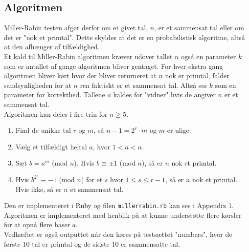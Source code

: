 \documentclass[12pt]{article}
\begin{document}
\subsection*{Algoritmen}
Miller-Rabin testen afgør derfor om et givet tal, $n$, er et sammensat tal eller om det er "nok et primtal". Dette skyldes at det er en probabilistisk algoritme, altså at den afhænger af tilfældighed. \\
Et kald til Miller-Rabin algoritmen kræver udover tallet $n$ også en parameter $k$ som er antallet af gange algoritmen bliver gentaget. For hver ekstra gang algoritmen bliver kørt hvor der bliver returneret at $n$ nok er primtal, falder sandsynligheden for at $n$ ren faktiskt er et sammensat tal. Altså ses $k$ som en parameter for korrekthed. Tallene $a$ kaldes for "vidner" hvis de angiver $n$ er et sammensat tal. \\
Algoritmen kan deles i fire trin for $n\geq 5$.
\begin{enumerate}
\item Find de unikke tal $r$ og $m$, så $n-1=2^r\cdot m$ og $m$ er ulige.
\item Vælg et tilfældigt heltal $a$, hvor $1<a<n$.
\item Sæt $b=a^m$ (mod $n$). Hvis $b\equiv \pm 1$ (mod $n$), så er $n$ nok et primtal.
\item Hvis $b^{2^s}\equiv -1$ (mod $n$) for et $s$ hvor $1\leq s\leq r-1$, så er $n$ nok et primtal. Hvis ikke, så er $n$ et sammensat tal.
\end{enumerate}
Den er implementeret i Ruby og filen \texttt{millerrabin.rb} kan ses i Appendix 1. Algoritmen er implementeret med henblik på at kunne understøtte flere kørsler for at opnå flere baser $a$. \\
Vedhæftet er også outputtet når den køres på testsættet "numbers", hvor de første 10 tal er primtal og de sidste 10 er sammensatte tal.
\end{document}
